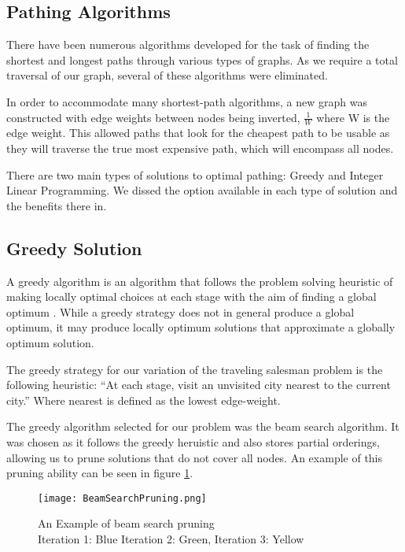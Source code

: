 \documentclass[bsc,frontabs,twoside,singlespacing,parskip,deptreport]{infthesis}     %
\begin{document}
\subsection{Pathing Algorithms}
There have been numerous algorithms developed for the task of finding the shortest and longest paths through various types of graphs.
As we require a total traversal of our graph, several of these algorithms were eliminated.

In order to accommodate many shortest-path algorithms, a new graph was constructed with edge weights between nodes being inverted,
$\frac{1}{W}$ where W is the edge weight. This allowed paths that look for the cheapest path to be usable as they will traverse the
true most expensive path, which will encompass all nodes.

There are two main types of solutions to optimal pathing: Greedy and Integer Linear Programming.
We dissed the option available in each type of solution and the benefits there in.

\subsection{Greedy Solution}
A greedy algorithm is an algorithm that follows the problem solving heuristic of making locally optimal choices at each stage with the aim
of finding a global optimum \cite{black2004dictionary}.
While a greedy strategy does not in general produce a global optimum, it may produce locally optimum solutions that approximate a globally optimum solution.


The greedy strategy for our variation of the traveling salesman problem is the following heuristic:
``At each stage, visit an unvisited city nearest to the current city.''
Where nearest is defined as the lowest edge-weight.


The greedy algorithm selected for our problem was the beam search algorithm.
It was chosen as it follows the greedy heruistic and also stores partial orderings, allowing us to prune solutions that do not cover all nodes.
An example of this pruning ability can be seen in figure \ref{fig:beam-prune}.

\begin{figure}
  \texttt{[image: BeamSearchPruning.png]}
  \caption{An Example of beam search pruning\\ Iteration 1: Blue Iteration 2: Green, Iteration 3: Yellow}
  \label{fig:beam-prune}
\end{figure}
\end{document}

